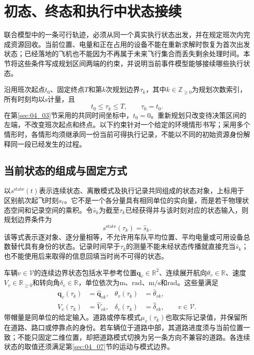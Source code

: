 \section{初态、终态和执行中状态接续}
\label{sec:05_07}

联合模型中的一条可行轨迹，必须从同一个真实执行状态出发，并在规定班次内完成资源回收。当前位置、电量和正在占用的设备不能在重新求解时恢复为首次出发状态；已经落地的飞机也不能因为不再属于未来飞行集合而丢失剩余处理时间。本节将这些条件写成规划区间两端的约束，并说明当前事件模型能够接续哪些执行状态。

沿用班次起点$t_0$、固定终点$T$和第$k$次规划边界$\tau_k$，其中$k\in\mathbb Z_{\ge0}$为规划次数索引，所有时刻均以$\mathrm s$计量，且
\begin{equation}
 t_0\le\tau_k\le T,\qquad \tau_0=t_0.
 \label{s0507:planning_clock}
\end{equation}
在第\ref{sec:04_03}节采用的共同时间坐标中，$t_0=0$。重新规划只改变待决策区间的左端，不改变班次起点和终点。以下约束针对一个给定的环境情形书写；采用多个情形时，各情形均须继承同一份当前可得执行记录，不能以不同的初始资源身份解释同一段已经发生的过程。

\subsection{当前状态的组成与固定方式}

以$s^{\mathrm{state}}(t)$表示连续状态、离散模式及执行记录共同组成的状态对象，上标用于区别航次起飞时刻$s_\ell$。它不是一个各分量具有相同单位的实向量，而是若干物理状态空间和记录空间的乘积。令$\widehat s_k$为截至$\tau_k$已经获得并与该时刻对应的状态输入，则规划边界条件为
\begin{equation}
 s^{\mathrm{state}}(\tau_k)=\widehat s_k.
 \label{s0507:state_boundary}
\end{equation}
该等式表示逐对象、逐分量相等，不允许用车队平均位置、平均电量或可用设备总数替代具有身份的状态。记录时间早于$\tau_k$的测量不能未经状态传播就直接充当$\widehat s_k$；也不能使用后来取得的信息回填当时尚不可得的状态。

车辆$v\in\mathcal V$的连续边界状态包括水平参考位置$\mathbf q_v\in\mathbb R^2$、连续展开航向$\theta_v\in\mathbb R$、速度$V_v\in\mathbb R_{\ge0}$和转向角$\delta_v\in\mathbb R$，单位依次为$\mathrm m$、$\mathrm{rad}$、$\mathrm{m/s}$和$\mathrm{rad}$。这些量满足
\begin{equation}
 \begin{aligned}
 \mathbf q_v(\tau_k)&=\widehat{\mathbf q}_{vk},&
 \theta_v(\tau_k)&=\widehat\theta_{vk},\\
 V_v(\tau_k)&=\widehat V_{vk},&
 \delta_v(\tau_k)&=\widehat\delta_{vk},
 \qquad v\in\mathcal V.
 \end{aligned}
 \label{s0507:vehicle_boundary}
\end{equation}
带帽量是同单位的给定输入。道路或停车模式$\mu_v(\tau_k)$也取实际记录值，并保留所在道路、路口或停靠点的身份。若车辆位于道路中部，其道路进度须与当前位置一致；不能只固定二维位置，却把道路模式切换为另一条方向不兼容的道路。各连续状态的取值还须满足第\ref{sec:04_07}节的运动与模式边界。

